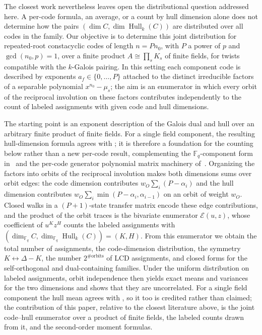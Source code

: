 \documentclass[10pt,journal,draftclsnofoot,onecolumn]{IEEEtran}
\theoremstyle{definition}
\theoremstyle{remark}
\newcommand{\Fq}{\mathbb{F}_q}
\newcommand{\Hull}{\operatorname{Hull}}
\begin{document}
The closest work nevertheless leaves open the distributional question
addressed here. A per-code formula, an average, or a count by hull
dimension alone does not determine how the pairs
\((\dim C, \dim \Hull_k(C))\) are distributed over all codes in the
family. Our objective is to determine this joint distribution for
repeated-root constacyclic codes of length \(n = P n_0\), with \(P\)
a power of \(p\) and \(\gcd(n_0,p)=1\), over a finite product
\(A \cong \prod_s K_s\) of finite fields, for twists compatible with
the \(k\)-Galois pairing. In this setting each component code is
described by exponents \(a_f \in \{0,\dots,P\}\) attached to the
distinct irreducible factors of a separable polynomial
\(x^{n_0} - \mu_s\); the aim is an enumerator in which every orbit of
the reciprocal involution on these factors contributes independently
to the count of labeled assignments with given code and hull
dimensions.

The starting point is an exponent description of the Galois dual and
hull over an arbitrary finite product of finite fields. For a single
field component, the resulting hull-dimension formula agrees with
\cite[Theorem~3]{DPI2023}; it is therefore a foundation for the
counting below rather than a new per-code result, complementing the
\(\Fq\)-component form in~\cite{DIMP2026} and the per-code generator
polynomial matrix machinery of~\cite{ES2026}. Organizing the factors
into orbits of the reciprocal involution makes both dimensions sums
over orbit edges: the code dimension contributes
\(w_O \sum_i (P-\alpha_i)\) and the hull dimension contributes
\(w_O \sum_i \min(P-\alpha_i, \alpha_{i-1})\) on an orbit of weight
\(w_O\). Closed walks in a \((P{+}1)\)-state transfer matrix encode
these edge contributions, and the product of the orbit traces is the
bivariate enumerator \(\mathcal{E}(u,z)\), whose coefficient of
\(u^K z^H\) counts the labeled assignments with
\((\dim_{\Fq} C, \dim_{\Fq} \Hull_k(C)) = (K,H)\). From this
enumerator we obtain the total number of assignments, the
code-dimension distribution, the symmetry
\(K \leftrightarrow \Delta - K\), the number
\(2^{\#\mathrm{orbits}}\) of LCD assignments, and closed forms for
the self-orthogonal and dual-containing families. Under the uniform
distribution on labeled assignments, orbit independence then yields
exact means and variances for the two dimensions and shows that they
are uncorrelated. For a single field component the hull mean agrees
with \cite[Theorem~3.3]{DP2025}, so it too is credited rather than
claimed; the contribution of this paper, relative to the closest
literature above, is the joint code--hull enumerator over a product
of finite fields, the labeled counts drawn from it, and the
second-order moment formulas.
\end{document}
